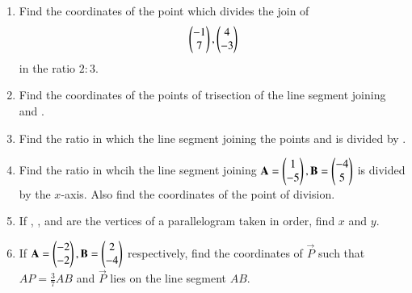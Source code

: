 \renewcommand{\theequation}{\theenumi}
\begin{enumerate}[label=\arabic*.,ref=\thesubsection.\theenumi]
\item Find the coordinates of the point which divides the join of 
\begin{align}
\begin{pmatrix}-1\\7\end{pmatrix},  \begin{pmatrix}4\\-3\end{pmatrix}
\end{align}
%
in the ratio $2:3$.
\\
\solution


\item Find the coordinates of the points of trisection of the line segment joining  and .
\\
\solution

\item Find the ratio in which the line segment joining the points  and  is divided by .
\\
\solution

\item Find the ratio in whcih the line segment joining $\mathbf{A}=\begin{pmatrix}1\\-5\end{pmatrix}, \mathbf{B}=\begin{pmatrix}-4\\5\end{pmatrix}$ is divided by the $x$-axis.  Also find the coordinates of the point of division.
\\
\solution

\item If , ,  and  are the vertices of a parallelogram taken in order, find $x$ and $y$.
\item If $\mathbf{A}=\begin{pmatrix}-2\\-2\end{pmatrix}, \mathbf{B}=\begin{pmatrix}2\\-4\end{pmatrix}$ respectively, find the coordinates of $\vec{P}$ such that $AP = \frac{3}{7}AB$ and $\vec{P}$ lies on the line segment $AB$.

\end{enumerate}
